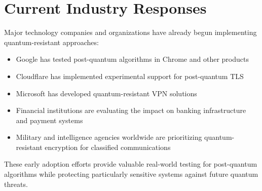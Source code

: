 \section{Current Industry Responses}
Major technology companies and organizations have already begun implementing quantum-resistant approaches:
\begin{itemize}
    \item Google has tested post-quantum algorithms in Chrome and other products
    \item Cloudflare has implemented experimental support for post-quantum TLS
    \item Microsoft has developed quantum-resistant VPN solutions
    \item Financial institutions are evaluating the impact on banking infrastructure and payment systems
    \item Military and intelligence agencies worldwide are prioritizing quantum-resistant encryption for classified communications
\end{itemize}

These early adoption efforts provide valuable real-world testing for post-quantum algorithms while protecting particularly sensitive systems against future quantum threats.
